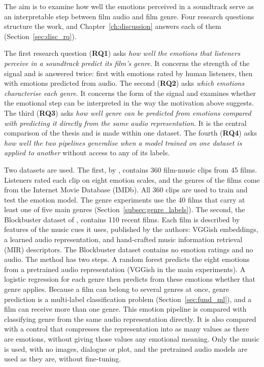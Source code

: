 The aim is to examine how well the emotions perceived in a soundtrack serve as an interpretable step between
film audio and film genre. Four research questions structure the work, and Chapter~\ref{ch:discussion} answers each of
them (Section~\ref{sec:disc_rq}).

The first research question (\textbf{RQ1}) asks \emph{how well the emotions that listeners perceive in a soundtrack predict its film's genre}. It concerns the strength of the signal and is answered
twice: first with emotions rated by human listeners, then with emotions predicted from audio.
The second (\textbf{RQ2}) asks \emph{which emotions characterise each genre}. It concerns the form of
the signal and examines whether the emotional step can be interpreted in the way the
motivation above suggests. The third (\textbf{RQ3}) asks \emph{how well genre can be predicted from emotions compared with predicting it directly from the same audio representation}. It is the
central comparison of the thesis and is made within one dataset. The fourth (\textbf{RQ4})
asks \emph{how well the two pipelines generalise when a model trained on one dataset is
applied to another} without access to any of its labels.

Two datasets are used. The first, by \citet{eerola2011comparison}, contains 360
film-music clips from 45 films. Listeners rated each clip on eight emotion scales, and the genres of the films come from the Internet Movie Database (IMDb). All 360 clips are used to train and test the emotion model. The genre experiments use the 40 films that carry at least one of five main genres (Section~\ref{subsec:genre_labels}). The second, the Blockbuster dataset of \citet{ma2021computational}, contains 110 recent films. Each film is described by features of the music cues it uses, published by the authors: VGGish embeddings, a learned audio representation, and hand-crafted music information retrieval (MIR) descriptors. The Blockbuster dataset contains no emotion ratings and no audio. The
method has two steps. A random forest predicts the eight emotions from a pretrained
audio representation (VGGish in the main experiments). A logistic regression for each
genre then predicts from these emotions whether that genre applies. Because a film can
belong to several genres at once, genre prediction is a multi-label classification problem
(Section~\ref{sec:fund_ml}), and a film can receive more than one genre. This emotion pipeline is compared with
classifying genre from the same audio representation directly. It is also compared with
a control that compresses the representation into as many values as there are emotions,
without giving those values any emotional meaning. Only the music is used, with no
images, dialogue or plot, and the pretrained audio models are used as they are, without
fine-tuning.

